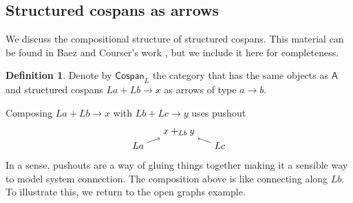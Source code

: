 \documentclass{amsart}
\newcommand{\A}{\cat{A}}
\newcommand{\Csp}{\cat{Cospan}}
\newcommand{\cat}[1]{\mathsf{#1}}
\newcommand{\csp}[3]{#1 + #3 \to #2}
\theoremstyle{remark}
\theoremstyle{definition}
\newtheorem{definition}[theorem]{Definition}
\begin{document}

\subsection{Structured cospans as arrows}
\label{sec:StrCsp-as-Arrows}

We discuss the compositional structure of structured
cospans. This material can be found in Baez and Courser's work
\cite{StrCsp}, but we include it here for completeness.

\begin{definition}
\label{def:strcsp-arr}  
  Denote by $ \Csp_{L} $ the category that has the same objects as
  $ \A $ and structured cospans $ \csp{La}{x}{Lb} $ as arrows of
  type $ a \to b $.
\end{definition}

Composing $ \csp{La}{x}{Lb} $ with $
\csp{Lb}{y}{Lc} $ uses pushout
%
\[
  \begin{tikzpicture}
    \begin{scope}[]
    \node (1) at (0,0) {\( La \)};
    \node (2) at (1.5,0.5) {\( x +_{Lb} y \)};
    \node (3) at (3,0) {\( Lc \)};
     \draw [->] (1) to node [] {\scriptsize{\(  \)}} (2);
    \draw [->] (3) to node [] {\scriptsize{\(  \)}} (2); 
    \end{scope}
  \end{tikzpicture}
\]
% 
In a sense, pushouts are a way of gluing things together making it a
sensible way to model system connection.  The composition above is
like connecting along $ Lb $. To illustrate this, we return to the open
graphs example.
\end{document}
